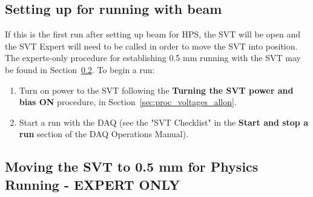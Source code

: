 \documentclass[12pt]{report}
\begin{document}
\subsection{Setting up for running with beam}
\label{sec:proc_general_startrun}
If this is the first run after setting up beam for HPS, the SVT will be open and the SVT Expert will need to be called in order to move the SVT into position. The experts-only procedure for establishing 0.5 mm running with the SVT may be found in Section~\ref{sec:proc_svt_0.5mm}.  To begin a run:
\begin{enumerate}
\item Turn on power to the SVT following the \textbf{Turning the SVT power and bias ON} procedure, in Section~\ref{sec:proc_voltages_allon}.
\item Start a run with the DAQ (see the "SVT Checklist" in the \textbf{Start and stop a run} section of the DAQ Operations Manual).
\end{enumerate}

\subsection{Moving the SVT to 0.5 mm for Physics Running - \textbf{EXPERT ONLY}}
\label{sec:proc_svt_0.5mm}
\end{document}
